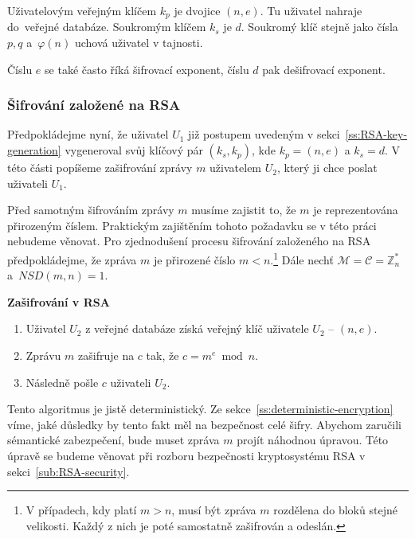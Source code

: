 \documentclass[
  program=infoi,
  biblatex=false,
  figures=true,
  glossaries,
  tables=false,
  sourcecodes=true,
  index
]{kidiplom}
\begin{document}
        Uživatelovým veřejným klíčem $k_p$ je dvojice $(n, e)$.
        Tu uživatel nahraje do~veřejné databáze.
        Soukromým klíčem $k_s$ je $d$.
        Soukromý klíč stejně jako čísla $p, q$ a~$\varphi(n)$ uchová uživatel v tajnosti.

        Číslu $e$ se také často říká šifrovací exponent, číslu $d$ pak dešifrovací exponent.


    \subsubsection{Šifrování založené na RSA}\label{ss:RSA-ciphering}

        Předpokládejme nyní, že uživatel $U_1$ již postupem uvedeným v sekci~\ref{ss:RSA-key-generation} vygeneroval svůj klíčový pár
        $(k_s, k_p)$, kde $k_p = (n,e)$ a $k_s = d$.
        V této části popíšeme zašifrování zprávy $m$ uživatelem $U_2$, který ji chce poslat uživateli $U_1$.

        Před samotným šifrováním zprávy $m$ musíme zajistit to, že $m$ je reprezentována přirozeným číslem.
        Praktickým zajištěním tohoto požadavku se v této práci nebudeme věnovat.
        Pro zjednodušení procesu šifrování založeného na RSA předpokládejme, že zpráva $m$ je přirozené číslo $m < n$.\footnote{V případech, kdy
        platí $m > n$, musí být zpráva $m$ rozdělena do bloků stejné velikosti. Každý z nich je poté samostatně zašifrován a odeslán.}
        Dále nechť $\mathcal{M} = \mathcal{C} = \mathbb{Z}^*_n$ a~$NSD(m,n) = 1$.

        \bigskip
        \noindent
        \textbf{Zašifrování v RSA}
            \begin{enumerate}
                \item 
                    Uživatel $U_2$ z veřejné databáze získá veřejný klíč uživatele $U_2$ -- $(n,e)$.
                \item
                    Zprávu $m$ zašifruje na $c$ tak, že $c = m^e \bmod{n}$.
                \item    
                    Následně pošle $c$ uživateli $U_2$.
            \end{enumerate}

            Tento algoritmus je jistě deterministický.
            Ze sekce~\ref{ss:deterministic-encryption} víme, jaké důsledky by tento fakt měl na bezpečnost celé šifry.
            Abychom zaručili sémantické zabezpečení, bude muset zpráva $m$ projít náhodnou úpravou.
            Této úpravě se budeme věnovat při rozboru bezpečnosti kryptosystému RSA v sekci~\ref{sub:RSA-security}.
\end{document}
